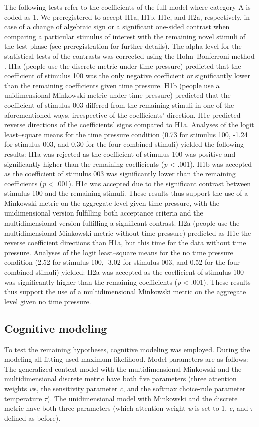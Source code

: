 \documentclass[a4paper,man,natbib]{apa6}
\begin{document}
The following tests refer to the coefficients of the full model where category A is coded as 1. We preregistered to accept H1a, H1b, H1c, and H2a, respectively, in case of a change of algebraic sign or a significant one-sided contrast when comparing a particular stimulus of interest with the remaining novel stimuli of the test phase (see preregistration for further details). The alpha level for the statistical tests of the contrasts was corrected using the Holm--Bonferroni method \citep{holm1979simple}. H1a (people use the discrete metric under time pressure) predicted that the coefficient of stimulus 100 was the only negative coefficient or significantly lower than the remaining coefficients given time pressure. H1b (people use a unidimensional Minkowski metric under time pressure) predicted that the coefficient of stimulus 003 differed from the remaining stimuli in one of the aforementioned ways, irrespective of the coefficients' direction. H1c predicted reverse directions of the coefficients' signs compared to H1a. Analyses of the logit least--square means for the time pressure condition (0.73 for stimulus 100, -1.24 for stimulus 003, and 0.30 for the four combined stimuli) yielded the following results: H1a was rejected as the coefficient of stimulus 100 was positive and significantly higher than the remaining coefficients (\textit{p} < .001). H1b was accepted as the coefficient of stimulus 003 was significantly lower than the remaining coefficients (\textit{p} < .001). H1c was accepted due to the significant contrast between stimulus 100 and the remaining stimuli. These results thus support the use of a Minkowski metric on the aggregate level given time pressure, with the unidimensional version fulfilling both acceptance criteria and the multidimensional version fulfilling a significant contrast. H2a (people use the multidimensional Minkowski metric without time pressure) predicted as H1c the reverse coefficient directions than H1a, but this time for the data without time pressure. Analyses of the logit least--square means for the no time pressure condition (2.52 for stimulus 100, -3.02 for stimulus 003, and 0.52 for the four combined stimuli) yielded: H2a was accepted as the coefficient of stimulus 100 was significantly higher than the remaining coefficients (\textit{p} < .001). These results thus support the use of a multidimensional Minkowski metric on the aggregate level given no time pressure.

\subsection{Cognitive modeling}
To test the remaining hypotheses, cognitive modeling was employed. During the modeling all fitting used maximum likelihood. Model parameters are as follows: The generalized context model with the multidimensional Minkowski and the multidimensional discrete metric have both five parameters (three attention weights \textit{w}s, the sensitivity parameter \textit{c}, and the softmax choice-rule parameter temperature $\tau$). The unidimensional model with Minkowski and the discrete metric have both three parameters (which attention weight \textit{w} is set to 1, \textit{c}, and $\tau$ defined as before).
\end{document}
